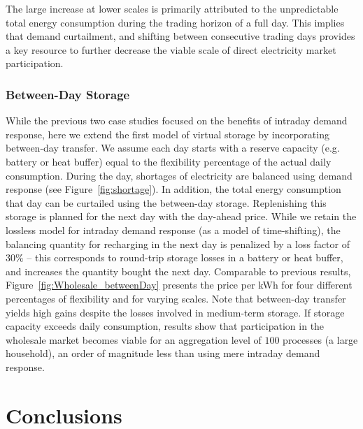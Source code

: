 \documentclass[conference]{IEEEtran}
\begin{document}
The large increase at lower scales is primarily attributed to the unpredictable total energy consumption during the trading horizon of a full day. This implies that demand curtailment, and shifting between consecutive trading days provides a key resource to further decrease the viable scale of direct electricity market participation.

\subsubsection{Between-Day Storage}

While the previous two case studies focused on the benefits of intraday demand response, here we extend the first model of virtual storage by incorporating between-day transfer. We assume each day starts with a reserve capacity (e.g. battery or heat buffer) equal to the flexibility percentage of the actual daily consumption. During the day, shortages of electricity are balanced using demand response (see Figure~\ref{fig:shortage}). In addition, the total energy consumption that day can be curtailed using the between-day storage. Replenishing this storage is planned for the next day with the day-ahead price. While we retain the lossless model for intraday demand response (as a model of time-shifting), the balancing quantity for recharging in the next day is penalized by a loss factor of $30\%$ -- this corresponds to round-trip storage losses in a battery or heat buffer, and increases the quantity bought the next day. Comparable to previous results, Figure~\ref{fig:Wholesale_betweenDay} presents the price per kWh for four different percentages of flexibility and for varying scales. Note that between-day transfer yields high gains despite the losses involved in medium-term storage. If storage capacity exceeds daily consumption, results show that participation in the wholesale market becomes viable for an aggregation level of $100$ processes (a large household), an order of magnitude less than using mere intraday demand response.


\section{Conclusions}
\label{sec:Conclusion}
\end{document}

